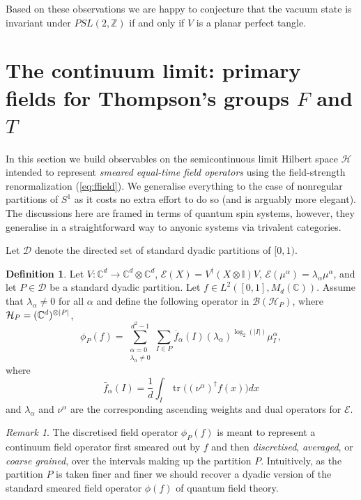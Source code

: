 \documentclass[11pt,oneside]{amsart}
\DeclareMathOperator{\tr}{tr}
\theoremstyle{plain}%
\theoremstyle{definition}
\newtheorem{definition}{Definition}[section]
\theoremstyle{remark}
\newtheorem*{remark}{Remark}
\DeclarePairedDelimiter\abs{\lvert}{\rvert}
\begin{document}
Based on these observations we are happy to conjecture that the vacuum state is invariant under $\mathit{PSL}(2,\mathbb{Z})$ if and only if $V$ is a planar perfect tangle.

\section{\texorpdfstring{The continuum limit: primary fields for Thompson's groups $F$ and $T$}{The continuum limit: primary fields for Thompson's groups F and T}}\label{sec:primaryfields}
In this section we build observables on the semicontinuous limit Hilbert space $\mathcal{H}$ intended to represent \emph{smeared equal-time field operators} using the field-strength renormalization (\ref{eq:ffield}). We generalise everything to the case of nonregular partitions of $S^1$ as it costs no extra effort to do so (and is arguably more elegant). The discussions here are framed in terms of quantum spin systems, however, they generalise in a straightforward way to anyonic systems via trivalent categories.

Let $\mathcal{D}$ denote the directed set of standard dyadic partitions of $[0,1)$.
\begin{definition}
	Let $V\colon\mathbb{C}^d\to \mathbb{C}^d\otimes \mathbb{C}^d$, $\mathcal{E}(X) = V^\dag (X\otimes \mathbb{I}) V$, $\mathcal{E}(\mu^\alpha)= \lambda_\alpha\mu^\alpha$, and let $P\in\mathcal{D}$ be a standard dyadic partition. Let $f\in L^2([0,1],M_d(\mathbb{C}))$. Assume that $\lambda_\alpha\not=0$ for all $\alpha$ and define the following operator in $\mathcal{B}(\mathcal{H}_{P})$, where $\mathcal{H}_P=(\mathbb{C}^d)^{\otimes\abs{P}}$,
	\begin{equation}\label{eq:smearedfieldoperator}
		\phi_{{P}}(f) = \sum_{\substack{\alpha = 0 \\ \lambda_\alpha \not= 0}}^{d^2-1}\sum_{I\in {P}} \overline{f}_\alpha(I) (\lambda_\alpha)^{\log_2(|I|)}\mu_I^\alpha,
	\end{equation}
	where
	\begin{equation}
		\bar{f}_\alpha(I) = \frac{1}{d}\int_{I} \tr\bigl((\nu^\alpha)^\dag f(x)\bigr) dx
	\end{equation}
	and $\lambda_\alpha$ and $\nu^\alpha$ are the corresponding ascending weights and dual operators for $\mathcal{E}$.

\end{definition}
\begin{remark}
	The discretised field operator $\phi_{{P}}(f)$ is meant to represent a continuum field operator first smeared out by $f$ and then \emph{discretised}, \emph{averaged}, or \emph{coarse grained}, over the intervals making up the partition $P$. Intuitively, as the partition $P$ is taken finer and finer we should recover a dyadic version of the standard smeared field operator $\phi(f)$ of quantum field theory.
\end{remark}
\end{document}
